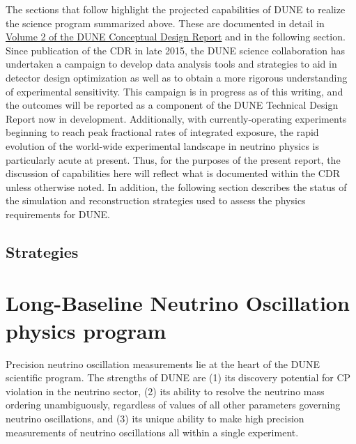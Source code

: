 The sections that follow highlight the projected capabilities of DUNE to realize the science program 
summarized above. These are documented in detail in \href{http://arxiv.org/abs/1512.06148}{Volume 2 
of the DUNE Conceptual Design Report} and in the following section.  Since publication of the CDR in late 2015, the DUNE science collaboration has undertaken a campaign to develop data analysis tools and strategies to aid 
in detector design optimization as well as to obtain a more rigorous understanding of experimental 
sensitivity.  This campaign is in progress as of this writing, and the outcomes will be reported 
as a component of the DUNE Technical Design Report now in development.  Additionally, with 
currently-operating experiments beginning to reach peak fractional rates of integrated exposure, 
the rapid evolution of the world-wide experimental landscape in neutrino physics is particularly acute 
at present.  Thus, for the purposes of the present report, the discussion of capabilities here 
will reflect what is documented within the CDR unless otherwise noted. In addition, the following section describes the status of the simulation and reconstruction strategies used to assess the physics requirements for DUNE.

\subsection{Strategies}
\label{sec:exec-summ-physics-ryan}


\section{Long-Baseline Neutrino Oscillation physics program}
\label{sec:exec-summ-physics-osc}

Precision neutrino oscillation measurements lie at the heart of the DUNE scientific program.  The strengths of DUNE are (1) its discovery potential for CP violation in the neutrino sector, (2) its ability to resolve the neutrino mass ordering unambiguously, regardless of values of all other parameters governing neutrino oscillations, and (3) its unique ability to make high precision measurements of neutrino oscillations all within a single experiment.

